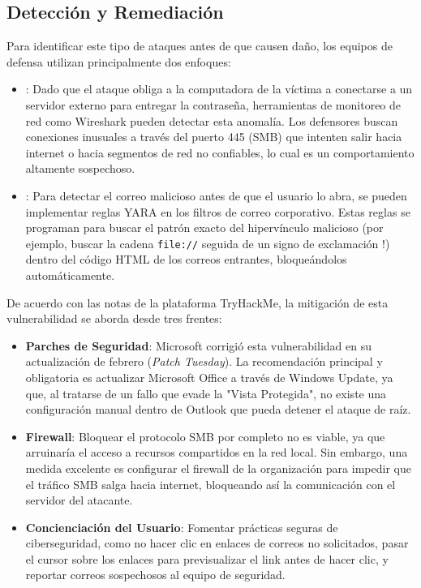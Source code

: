 \subsection{Detección y Remediación}
Para identificar este tipo de ataques antes de que causen daño, los equipos de defensa utilizan principalmente dos enfoques:
\begin{itemize}
	\item {}: Dado que el ataque obliga a la computadora de la víctima a conectarse a un servidor externo para entregar la contraseña, herramientas de monitoreo de red como Wireshark pueden detectar esta anomalía. Los defensores buscan conexiones inusuales a través del puerto 445 (SMB) que intenten salir hacia internet o hacia segmentos de red no confiables, lo cual es un comportamiento altamente sospechoso.
	\item {}: Para detectar el correo malicioso antes de que el usuario lo abra, se pueden implementar reglas YARA en los filtros de correo corporativo. Estas reglas se programan para buscar el patrón exacto del hipervínculo malicioso (por ejemplo, buscar la cadena \texttt{file://} seguida de un signo de exclamación !) dentro del código HTML de los correos entrantes, bloqueándolos automáticamente.
\end{itemize}
De acuerdo con las notas de la plataforma TryHackMe, la mitigación de esta vulnerabilidad se aborda desde tres frentes:
\begin{itemize}
	\item \textbf{Parches de Seguridad}: Microsoft corrigió esta vulnerabilidad en su actualización de febrero (\textit{Patch Tuesday}). La recomendación principal y obligatoria es actualizar Microsoft Office a través de Windows Update, ya que, al tratarse de un fallo que evade la "Vista Protegida", no existe una configuración manual dentro de Outlook que pueda detener el ataque de raíz.
	\item \textbf{Firewall}: Bloquear el protocolo SMB por completo no es viable, ya que arruinaría el acceso a recursos compartidos en la red local. Sin embargo, una medida excelente es configurar el firewall de la organización para impedir que el tráfico SMB salga hacia internet, bloqueando así la comunicación con el servidor del atacante.
	\item \textbf{Concienciación del Usuario}: Fomentar prácticas seguras de ciberseguridad, como no hacer clic en enlaces de correos no solicitados, pasar el cursor sobre los enlaces para previsualizar el link antes de hacer clic, y reportar correos sospechosos al equipo de seguridad.
\end{itemize}

